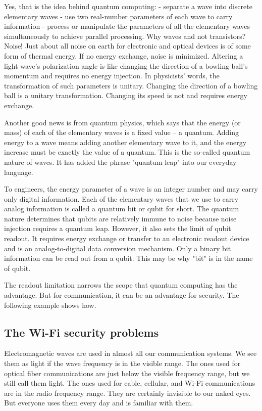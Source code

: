 \documentclass[oneside, letter, 12pt]{book}
\begin{document}
Yes, that is the idea behind quantum computing:
- separate a wave into discrete elementary waves
- use two real-number parameters of each wave to carry information
- process or manipulate the parameters of all the elementary waves simultaneously to achieve parallel processing.
Why waves and not transistors? Noise! Just about all noise on earth for electronic and optical devices is of some form of thermal energy. If no energy exchange, noise is minimized. Altering a light wave's polarization angle is like changing the direction of a bowling ball's momentum and requires no energy injection. In physicists' words, the transformation of such parameters is unitary. Changing the direction of a bowling ball is a unitary transformation. Changing its speed is not and requires energy exchange.

Another good news is from quantum physics, which says that the energy (or mass) of each of the elementary waves is a fixed value -- a quantum. Adding energy to a wave means adding another elementary wave to it, and the energy increase must be exactly the value of a quantum. This is the so-called quantum nature of waves. It has added the phrase "quantum leap" into our everyday language.

To engineers, the energy parameter of a wave is an integer number and may carry only digital information. Each of the elementary waves that we use to carry analog information is called a quantum bit or qubit for short. The quantum nature determines that qubits are relatively immune to noise because noise injection requires a quantum leap. However, it also sets the limit of qubit readout. It requires energy exchange or transfer to an electronic readout device and is an analog-to-digital data conversion mechanism. Only a binary bit information can be read out from a qubit. This may be why "bit" is in the name of qubit.

The readout limitation narrows the scope that quantum computing has the advantage. But for communication, it can be an advantage for security. The following example shows how.

\subsection{The Wi-Fi security problems}\label{Sec-example-wifi}
Electromagnetic waves are used in almost all our communication systems. We see them as light if the wave frequency is in the visible range. The ones used for optical fiber communications are just below the visible frequency range, but we still call them light. The ones used for cable, cellular, and Wi-Fi communications are in the radio frequency range. They are certainly invisible to our naked eyes. But everyone uses them every day and is familiar with them.
\end{document}
